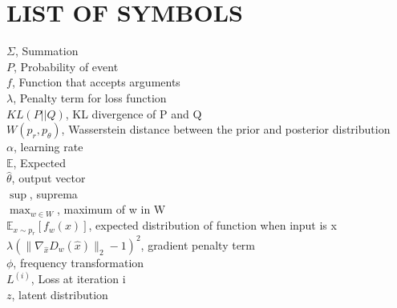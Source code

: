 \chapter*{LIST OF SYMBOLS}
\vspace{\baselineskip}
\begin{flushleft}
$\Sigma$, Summation\\
\vspace{\baselineskip}
$P$, Probability of event\\
\vspace{\baselineskip}
$f$, Function that accepts arguments\\
\vspace{\baselineskip}
$\lambda$, Penalty term for loss function\\
\vspace{\baselineskip}
$KL(P||Q)$, KL divergence of P and Q\\
\vspace{\baselineskip}
$W(p_r, p_\theta)$, Wasserstein distance between the prior and posterior distribution\\
\vspace{\baselineskip}
$\alpha$, learning rate\\
\vspace{\baselineskip}
$\mathbb{E}$, Expected\\
\vspace{\baselineskip}
$\hat{\theta}$, output vector\\
\vspace{\baselineskip}
$\sup$, suprema \\
\vspace{\baselineskip}
$\max_{w \in W}$, maximum of w in W\\
\vspace{\baselineskip}
$\mathbb{E}_{x \sim p_r}[f_w(x)]$, expected distribution of function when input is x\\
\vspace{\baselineskip}
$\lambda(\|{\nabla_{\hat{x}} D_{w}(\hat{x})}\|_{2} - 1)^2$, gradient penalty term\\
\vspace{\baselineskip}
$\phi$, frequency transformation\\
\vspace{\baselineskip}
$L^{(i)}$, Loss at iteration i\\
\vspace{\baselineskip}
$z$, latent distribution\\
\vspace{\baselineskip}

\end{flushleft}

